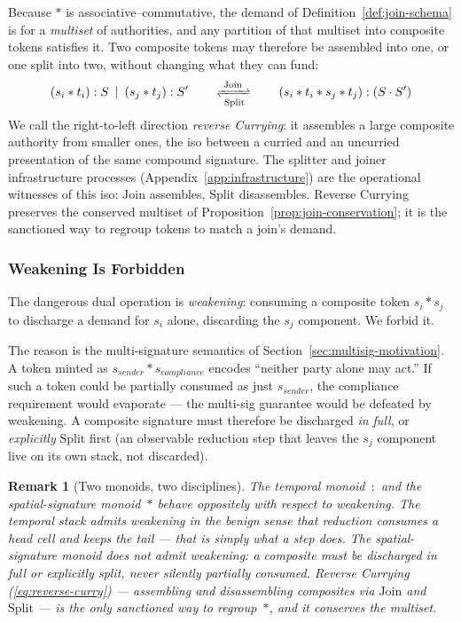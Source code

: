 \documentclass[11pt,a4paper]{article}
\newtheorem{remark}[theorem]{Remark}
\newcommand{\Par}{\mathbin{|}}
\newcommand{\comp}{\mathbin{*}}
\begin{document}
Because $\comp$ is associative--commutative, the demand of
Definition~\ref{def:join-schema} is for a \emph{multiset} of
authorities, and any partition of that multiset into composite
tokens satisfies it.  Two composite tokens may therefore be
assembled into one, or one split into two, without changing
what they can fund:
\begin{equation}
  (s_i \comp t_i) : S \;\Par\; (s_j \comp t_j) : S'
  \qquad\xrightleftharpoons[\;\mathrm{Split}\;]{\;\mathrm{Join}\;}\qquad
  (s_i \comp t_i \comp s_j \comp t_j) : (S \cdot S')
  \label{eq:reverse-curry}
\end{equation}
We call the right-to-left direction \emph{reverse Currying}:
it assembles a large composite authority from smaller ones,
the iso between a curried and an uncurried presentation of the
same compound signature.  The splitter and joiner
infrastructure processes
(Appendix~\ref{app:infrastructure}) are the operational
witnesses of this iso: $\mathrm{Join}$ assembles,
$\mathrm{Split}$ disassembles.  Reverse Currying preserves the
conserved multiset of Proposition~\ref{prop:join-conservation};
it is the sanctioned way to regroup tokens to match a join's
demand.

\subsubsection{Weakening Is Forbidden}

The dangerous dual operation is \emph{weakening}: consuming a
composite token $s_i \comp s_j$ to discharge a demand for
$s_i$ alone, discarding the $s_j$ component.  We forbid it.

The reason is the multi-signature semantics of
Section~\ref{sec:multisig-motivation}.  A token minted as
$s_{\mathit{sender}} \comp s_{\mathit{compliance}}$ encodes
``neither party alone may act.''  If such a token could be
partially consumed as just $s_{\mathit{sender}}$, the
compliance requirement would evaporate --- the multi-sig
guarantee would be defeated by weakening.  A composite
signature must therefore be discharged \emph{in full}, or
\emph{explicitly} $\mathrm{Split}$ first (an observable
reduction step that leaves the $s_j$ component live on its own
stack, not discarded).

\begin{remark}[Two monoids, two disciplines]
  The temporal monoid~$:$ and the spatial-signature
  monoid~$\comp$ behave oppositely with respect to weakening.
  The temporal stack \emph{admits} weakening in the benign
  sense that reduction consumes a head cell and keeps the tail
  --- that is simply what a step does.  The spatial-signature
  monoid \emph{does not} admit weakening: a composite must be
  discharged in full or explicitly split, never silently
  partially consumed.  Reverse Currying
  (\eqref{eq:reverse-curry}) --- assembling and disassembling
  composites via $\mathrm{Join}$ and $\mathrm{Split}$ --- is
  the only sanctioned way to regroup~$\comp$, and it conserves
  the multiset.
\end{remark}
\end{document}
